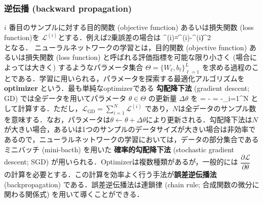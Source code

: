 \subsubsection{逆伝播 (backward propagation)}
$i$ 番目のサンプルに対する目的関数 (objective function) あるいは損失関数 (loss function)を $\mathcal{L}^{(i)}$とする．例えば2乗誤差の場合は
^{(i)}=\left\|^{(i)}-^{(i)}\right\|^{2}\\
となる．
ニューラルネットワークの学習とは，目的関数 (objective function) あるいは損失関数 (loss function) と呼ばれる評価指標を可能な限り小さく (場合によっては大きく) するようなパラメータ集合 $\Theta = \{W_\ell, b_\ell\}_{\ell=1}^{L}$ を求める過程のことである．学習に用いられる，パラメータを探索する最適化アルゴリズムを \textbf{optimizer} という．最も単純なoptimizerである \textbf{勾配降下法} (gradient descent; GD) では全データを用いてパラメータ $\theta \in \Theta$ の更新量 $\Delta \theta$ を 
\Delta \theta = -\eta {} = -\eta \sum_{i=1}^N 
として計算する．ただし，$\mathcal{L}_{\textrm{GD}}=\sum_{i=1}^N \mathcal{L}^{(i)}$ であり，$N$は全データのサンプル数を意味する．なお，パラメータは$\theta\leftarrow \theta + \Delta \theta$により更新される．勾配降下法は$N$が大きい場合，あるいは1つのサンプルのデータサイズが大きい場合は非効率であるので，ニューラルネットワークの学習においては，データの部分集合であるミニバッチ (mini-bacth) を用いた \textbf{確率的勾配降下法} (stochastic gradient descent; SGD) が用いられる．Optimizerは複数種類があるが，一般的には $\dfrac{\partial \mathcal{L}}{\partial \theta}$ の計算を必要とする．この計算を効率よく行う手法が\textbf{誤差逆伝播法} (backpropagation) である．誤差逆伝播法は連鎖律 (chain rule; 合成関数の微分に関わる関係式) を用いて導くことができる．
